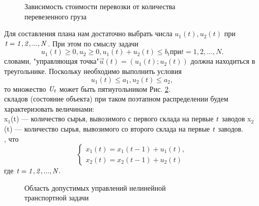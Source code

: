 \begin{figure}[h]
\caption{Зависимость стоимости перевозки от количества\\перевезенного груза}
\label{picture_7_2}
\end{figure}
Для составления плана нам достаточно выбрать числа $u_1(t), u_2(t)$ при $\it t=1,2,...,N$. При этом по смыслу задачи
\begin{equation}\label{equation_7_8}
 u_1(t)\ge 0,u_2 \ge 0, u_1(t)+u_2(t) \le b_t при t = 1,2,...,N.
\end{equation}
 словами, "управляющая точка"$\vec{u}(t)=(u_1(t);u_2(t))$ должна находиться в треугольнике. Поскольку необходимо выполнить условия
 \begin{equation*}
u_1(t) \le a_1,  u_2(t) \le a_2,
\end{equation*}
 то множество $\it U_t$ может быть пятиугольником Рис. \ref{picture_7_3}.\\
 складов (состояние объекта) при таком поэтапном распределении будем характеризовать величинами:\\
\indent x$_1$(t) — количество сырья, вывозимого с первого склада на первые $\it t$  заводов%
\indent x$_2$(t) — количество сырья, вывозимого со второго склада на первые  $\it t$  заводов.\\
, что
\begin{equation}{
\begin{cases}\label{equation_7_9}
  x_1(t) = x_1(t-1)+u_1(t),\\
  x_2(t) = x_2(t-1)+u_2(t)
\end{cases}}
\end{equation}
где $\it t=1, 2,..., N.$\\
\begin{figure}[h]
\caption{Область допустимых управлений нелинейной\\
транспортной задачи}
\label{picture_7_3}
\end{figure}
